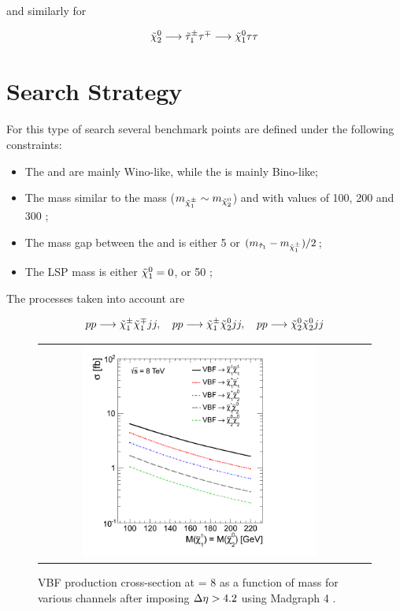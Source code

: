 and similarly for \neutralinotwo

\begin{equation}
\tilde{\chi}^{0}_{2} \longrightarrow \tilde{\tau}_{1}^{\pm} \tau^{\mp} \longrightarrow \tilde{\chi}^{0}_{1} \tau \tau
\end{equation}

\section {Search Strategy}
\label{section::search_strategy}

For this type of search several benchmark points are defined under the following constraints:
\begin{itemize}
	\item The \charginopm and \neutralinotwo are mainly Wino-like, while the \neutralinoone is mainly Bino-like;
	\item The \charginomp mass similar to the \neutralinotwo mass ($m_{\tilde{\chi}^{\pm}_{1}} \sim m_{\tilde{\chi}^{0}_{2}}$) and with values of 100, 200 and 300 \gev;
	\item The mass gap between the \stau and \charginopm is either 5 \gev or $(m_{\tilde{\tau}_{1}} - m_{\tilde{\chi}^{\pm}_{1}})/2$;
	\item The LSP mass is either $\tilde{\chi}^{0}_{1} = 0$, or 50 \gev;
\end{itemize}

The processes taken into account are

\begin{equation}
pp \longrightarrow \tilde{\chi}^{\pm}_{1} \tilde{\chi}^{\mp}_{1} jj, \quad pp \longrightarrow \tilde{\chi}^{\pm}_{1} \tilde{\chi}^{0}_{2} jj, \quad pp \longrightarrow \tilde{\chi}^{0}_{2} \tilde{\chi}^{0}_{2} jj
\end{equation}

\begin{figure}[tbh!]
	\centering
	\begin{tabular}{cc}
		\includegraphics[width=0.75\textwidth]{analysis/pics/VBFXsection.png}
	\end{tabular}
	\caption{VBF production cross-section at \CM = 8 \tev as a function of mass for various channels after imposing \ensuremath{\deltaeta > 4.2} using Madgraph 4 \cite{Dutta:2012xe}.}
	\label{fig:VBF_xsec}
\end{figure}

